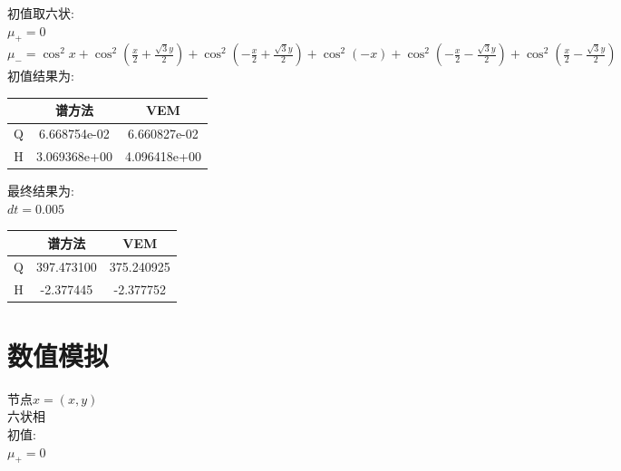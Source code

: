 \documentclass[12pt]{article}
\begin{document}
\begin{CJK}{UTF8}{gkai}
    初值取六状:\\
    
        $ \mu_+=0 $\\
        
        $ \mu_-=\cos^{2}x+\cos^2 (\frac{x}{2}+\frac{\sqrt{3}y}{2})+\cos^2(-\frac{x}{2}+\frac{\sqrt{3}y}{2})+\cos^{2}(-x)+\cos^2 (-\frac{x}{2}-\frac{\sqrt{3}y}{2})+\cos^2 (\frac{x}{2}-\frac{\sqrt{3}y}{2})$\\
        
        初值结果为:\\
             \begin{table}[H]
             	\centering
             	\begin{tabular}{ccc}
             		
             		\toprule
             		&谱方法 & VEM  \\
             		\midrule    
             		Q&6.668754e-02&6.660827e-02\\
             		H&3.069368e+00&4.096418e+00\\
             		\bottomrule
             	\end{tabular}
             \end{table} 
             最终结果为:\\
             
$dt=0.005$\\             
 \begin{table}[H]
 	\centering
 	\begin{tabular}{ccc}
 		
 		\toprule
 		&谱方法 & VEM  \\
 		\midrule    
 		Q&397.473100      &375.240925\\
 		H&-2.377445&-2.377752\\
 		\bottomrule
 	\end{tabular}
 \end{table} 
    
   \section{数值模拟}

    
    节点$x=(x,y)$\\
    
    六状相\\
    
    初值:\\
    
    $ \mu_+=0 $\\
    

\end{CJK}
\end{document}
